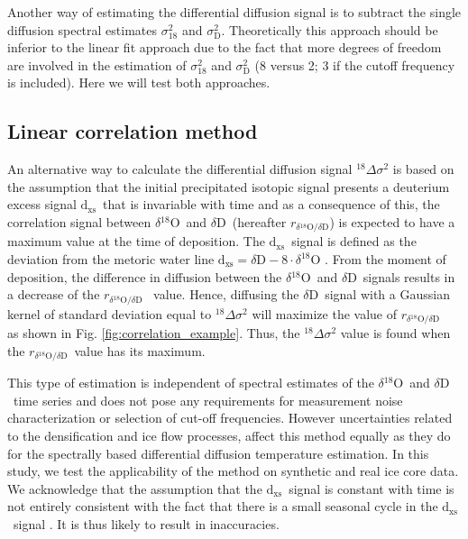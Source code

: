 \documentclass[11pt, draftcls, onecolumn]{IEEEtran} %
\numberwithin{equation}{section}
\numberwithin{table}{section}
\numberwithin{figure}{section}
\newcommand{\delOx}{$\delta{}^{18}\mathrm{O}$}
\newcommand{\delD}{$\delta\mathrm{D}$}
\newcommand{\Dxs}{$\mathrm{d_{xs}}$}
\newcommand{\delcorrel}{$r_{\delta{}^{18}\mathrm{O}/\delta\mathrm{D}}$}
\begin{document}
Another  way of estimating the differential diffusion signal is to subtract the single diffusion 
spectral estimates $\sigma^2_{18}$ and $\sigma^2_{\mathrm{D}}$. 
Theoretically this approach should be inferior to the linear fit approach due to the fact that 
more degrees of freedom are involved in the estimation of $\sigma^2_{18}$ and 
$\sigma^2_{\mathrm{D}}$ (8 versus 2; 3 if the cutoff frequency is included).
Here we will test both approaches.



\subsection*{Linear correlation method}
An alternative way to calculate the differential diffusion signal ${}^{18}\Delta\sigma^2$
is based on the assumption that the initial precipitated isotopic signal presents a deuterium excess signal \Dxs~that
is invariable with time and as a consequence of this, the correlation signal between \delOx~and \delD~(hereafter \delcorrel) is expected
to have a maximum value at the time of deposition.
The \Dxs~signal is defined as the deviation from the metoric water line $\mathrm{d_{xs}}= \delta\mathrm{D}- 8\cdot\delta^{18}\mathrm{O} $ \citep{craig, Dansgaard}.
From the moment of deposition, the difference in diffusion between the \delOx~and \delD~signals results
in a decrease of the \delcorrel~ value. Hence, diffusing the \delD~signal 
with a Gaussian kernel of standard deviation equal to ${}^{18}\Delta\sigma^2$ will maximize 
the value of \delcorrel~\citep{vanderWel2015a} as shown in Fig. \ref{fig:correlation_example}.  
Thus, the ${}^{18}\Delta\sigma^2$ value is found when the \delcorrel~value has its maximum.

This type of estimation is independent of spectral estimates of the \delOx~and \delD~time series
and does not pose any requirements for measurement noise characterization or selection of
cut-off frequencies. However uncertainties related to the densification and ice flow processes, affect
this method equally as they do for the spectrally based differential diffusion temperature estimation. 
In this study, we test the applicability of the method on synthetic and real ice core data.
We acknowledge that the assumption that the \Dxs~signal is constant with time is 
not entirely consistent with the fact that there is a small seasonal cycle in the \Dxs~signal \citep{Johnsen1989}.
It is thus likely to result in inaccuracies.
\end{document}
